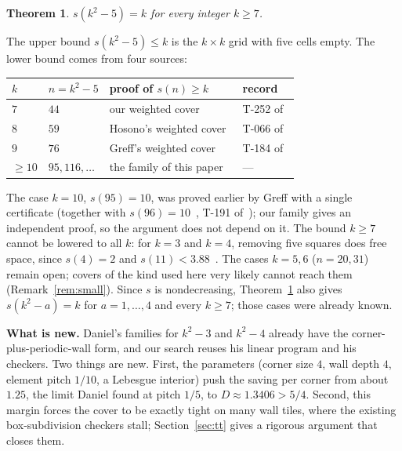 \documentclass[11pt]{amsart}
\newtheorem{theorem}{Theorem}
\theoremstyle{definition}
\theoremstyle{remark}
\begin{document}
\begin{theorem}\label{thm:main}
$s(k^2-5)=k$ for every integer $k\ge7$.
\end{theorem}

The upper bound $s(k^2-5)\le k$ is the $k\times k$ grid with five cells empty. The lower bound comes from four
sources:

\begin{center}
\begin{tabular}{llll}
\toprule
$k$ & $n=k^2-5$ & proof of $s(n)\ge k$ & record \\
\midrule
$7$ & $44$ & our weighted cover~\cite{s44} & T-252 of~\cite{squares} \\
$8$ & $59$ & Hosono's weighted cover~\cite{hosono59} & T-066 of~\cite{squares} \\
$9$ & $76$ & Greff's weighted cover~\cite{greff76} & T-184 of~\cite{squares} \\
$\ge10$ & $95,116,\dots$ & the family of this paper & --- \\
\bottomrule
\end{tabular}
\end{center}

\noindent The case $k=10$, $s(95)=10$, was proved earlier by Greff with a single certificate (together with
$s(96)=10$~\cite{greff95}, T-191 of~\cite{squares}); our family gives an independent proof, so the argument does not
depend on it. The bound $k\ge7$ cannot be lowered to all $k$: for $k=3$ and $k=4$, removing five squares does free
space, since $s(4)=2$ and $s(11)<3.88$~\cite{friedman}. The cases $k=5,6$ ($n=20,31$) remain open; covers of the kind
used here very likely cannot reach them (Remark~\ref{rem:small}). Since $s$ is nondecreasing, Theorem~\ref{thm:main} also gives $s(k^2-a)=k$ for
$a=1,\dots,4$ and every $k\ge7$; those cases were already known.

\smallskip
\noindent\textbf{What is new.} Daniel's families for $k^2-3$ and $k^2-4$ already have the corner-plus-periodic-wall
form, and our search reuses his linear program and his checkers. Two things are new. First, the parameters (corner
size $4$, wall depth $4$, element pitch $1/10$, a Lebesgue interior) push the saving per corner from about $1.25$, the
limit Daniel found at pitch $1/5$, to $D\approx1.3406>5/4$. Second, this margin forces the cover to be exactly
tight on many wall tiles, where the existing box-subdivision checkers stall; Section~\ref{sec:tt} gives a rigorous
argument that closes them.
\end{document}
